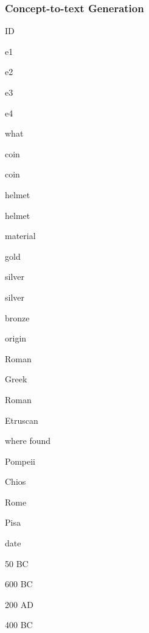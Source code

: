 \documentclass[compress,color=usenames]{beamer}
\begin{document}
\begin{frame}
\frametitle{Concept-to-text Generation}

ID

e1

e2

e3

e4

what

coin

coin

helmet

helmet

material

gold

silver

silver

bronze

origin

Roman

Greek

Roman

Etruscan

where found

Pompeii

Chios

Rome

Pisa

date

50 BC

600 BC

200 AD

400 BC

\end{frame}
\end{document}
